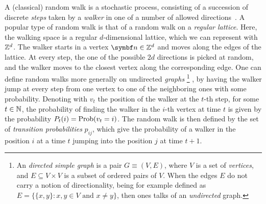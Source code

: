 A (classical) random walk is a stochastic process, consisting of a succession of discrete \textit{steps} taken by a \textit{walker} in one of a number of allowed directions~\cite{lovasz1993random}.
A popular type of random walk is that of a random walk on a \textit{regular lattice}. Here, the walking space is a regular $d$-dimensional lattice, which we can represent with $\mathbb{Z}^d$. The walker starts in a vertex $\bs n\in\ZZ^d$ and moves along the edges of the lattice.
At every step, the one of the possible $2d$ directions is picked at random, and the walker moves to the closest vertex along the corresponding edge.
One can define random walks more generally on undirected \textit{graphs}
\footnote{An \textit{directed simple graph} is a pair $G\equiv (V,E)$, where $V$ is a set of \textit{vertices}, and $E\subseteq V\times V$ is a subset of ordered pairs of $V$. When the edges $E$ do not carry a notion of directionality, being for example defined as $E=\{\{x,y\} : x,y\in V\text{ and }x\neq y\}$, then ones talks of an \textit{undirected} graph.}
, by having the walker jump at every step from one vertex to one of the neighboring ones with some probability.
Denoting with $v_t$ the position of the walker at the $t$-th step, for some $t\in\mathbb{N}$, the probability of finding the walker in the $i$-th vertex at time $t$ is given by the probability
$P_t(i)=\operatorname*{Prob}(v_t=i)$. The random walk is then defined by the set of \textit{transition probabilities} $p_{ij}$, which give the probability of a walker in the position $i$ at a time $t$ jumping into the position $j$ at time $t+1$.

%  


